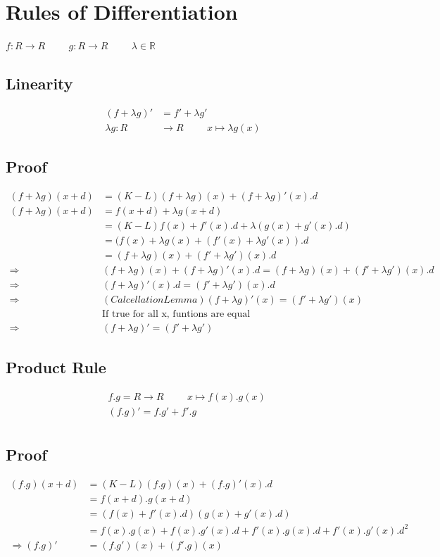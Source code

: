 \documentclass[a4paper,12pt]{article}
\begin{document}
\section*{Rules of Differentiation}
$f: R \to R \hspace{1cm} g: R \to R \hspace{1cm} \lambda \in \mathbb{R}$
\subsection*{Linearity}
\begin{align*}
(f + \lambda g)' &= f' + \lambda g' \\
\lambda g: R & \to R \hspace{1cm} x \mapsto \lambda g(x)
\end{align*}
\subsection*{Proof}
\begin{align*}
(f + \lambda g)(x + d) &= (K-L) (f + \lambda g)(x) + (f + \lambda g)'(x).d \\
(f + \lambda g)(x+d) & = f(x+d) + \lambda g(x+d) \\
& = (K-L) f(x) + f'(x).d + \lambda(g(x) + g'(x).d) \\
& = (f(x) + \lambda g(x) + (f'(x) + \lambda g'(x)).d \\
& = (f+\lambda g)(x) + (f' + \lambda g')(x).d \\
\Rightarrow &(f+\lambda g)(x) + (f + \lambda g)'(x).d = (f + \lambda g)(x) + (f' +\lambda g')(x).d \\
\Rightarrow & (f+\lambda g)'(x).d = (f' + \lambda g')(x).d \\
\Rightarrow & (Calcellation Lemma) (f+\lambda g)'(x) = (f' + \lambda g')(x)\\
& \text{If true for all x, funtions are equal} \\
\Rightarrow &(f+\lambda g)' = (f'+\lambda g')
\end{align*}
\subsection*{Product Rule}
\begin{align*}
& f.g = R \to R \hspace{1cm} x \mapsto f(x).g(x) \\
& (f.g)' = f.g' + f'.g \\
\end{align*}
\subsection*{Proof}
\begin{align*}
(f.g)(x+d) & = (K-L) (f.g)(x) + (f.g)'(x).d \\
& = f(x+d).g(x+d) \\
& = (f(x) + f'(x).d)(g(x) + g'(x).d) \\
& = f(x).g(x) + f(x).g'(x).d + f'(x).g(x).d + f'(x).g'(x).d^2 \\
\Rightarrow (f.g)' & = (f.g')(x) + (f'.g)(x) \\
\end{align*}
\end{document}

